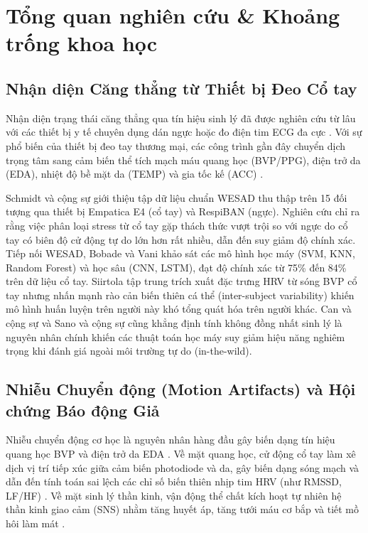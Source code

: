 \documentclass[conference]{IEEEtran}
\begin{document}
\section{Tổng quan nghiên cứu \& Khoảng trống khoa học}

\subsection{Nhận diện Căng thẳng từ Thiết bị Đeo Cổ tay}
Nhận diện trạng thái căng thẳng qua tín hiệu sinh lý đã được nghiên cứu từ lâu với các thiết bị y tế chuyên dụng dán ngực hoặc đo điện tim ECG đa cực \cite{taskforce1996heart}. Với sự phổ biến của thiết bị đeo tay thương mại, các công trình gần đây chuyển dịch trọng tâm sang cảm biến thể tích mạch máu quang học (BVP/PPG), điện trở da (EDA), nhiệt độ bề mặt da (TEMP) và gia tốc kế (ACC) \cite{can2019stress, gjoreski2016continuous}. 

Schmidt và cộng sự \cite{schmidt2018wesad} giới thiệu tập dữ liệu chuẩn WESAD thu thập trên 15 đối tượng qua thiết bị Empatica E4 (cổ tay) và RespiBAN (ngực). Nghiên cứu chỉ ra rằng việc phân loại stress từ cổ tay gặp thách thức vượt trội so với ngực do cổ tay có biên độ cử động tự do lớn hơn rất nhiều, dẫn đến suy giảm độ chính xác. Tiếp nối WESAD, Bobade và Vani \cite{bobade2020stress} khảo sát các mô hình học máy (SVM, KNN, Random Forest) và học sâu (CNN, LSTM), đạt độ chính xác từ 75\% đến 84\% trên dữ liệu cổ tay. Siirtola \cite{siirtola2019continuous} tập trung trích xuất đặc trưng HRV từ sóng BVP cổ tay nhưng nhấn mạnh rào cản biến thiên cá thể (inter-subject variability) khiến mô hình huấn luyện trên người này khó tổng quát hóa trên người khác. Can và cộng sự \cite{can2019stress} và Sano và cộng sự \cite{sano2018multimodal} cũng khẳng định tính không đồng nhất sinh lý là nguyên nhân chính khiến các thuật toán học máy suy giảm hiệu năng nghiêm trọng khi đánh giá ngoài môi trường tự do (in-the-wild).

\subsection{Nhiễu Chuyển động (Motion Artifacts) và Hội chứng Báo động Giả}
Nhiễu chuyển động cơ học là nguyên nhân hàng đầu gây biến dạng tín hiệu quang học BVP và điện trở da EDA \cite{zhang2014troika, schumm2010effect}. Về mặt quang học, cử động cổ tay làm xê dịch vị trí tiếp xúc giữa cảm biến photodiode và da, gây biến dạng sóng mạch và dẫn đến tính toán sai lệch các chỉ số biến thiên nhịp tim HRV (như RMSSD, LF/HF) \cite{zhang2014troika}. Về mặt sinh lý thần kinh, vận động thể chất kích hoạt tự nhiên hệ thần kinh giao cảm (SNS) nhằm tăng huyết áp, tăng tưới máu cơ bắp và tiết mồ hôi làm mát \cite{schumm2010effect}. 
\end{document}
